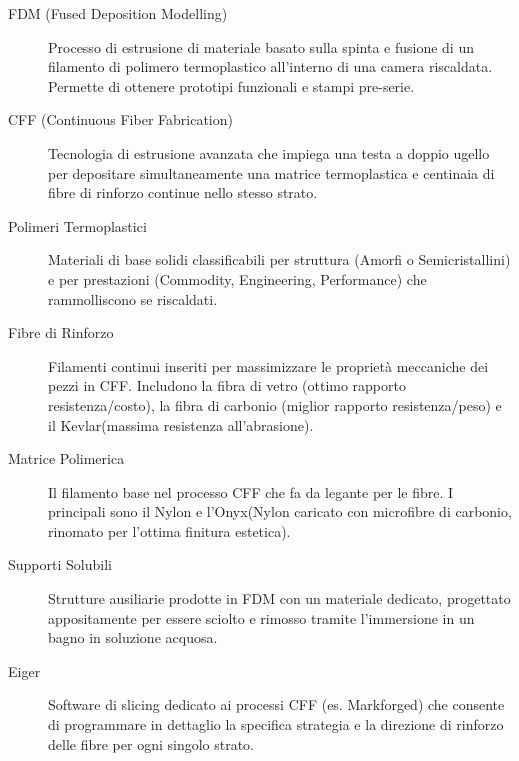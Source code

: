 \vspace{0.5cm}
\noindent{\large\sffamily\bfseries\textcolor{black!60}{Fabbricazione Additiva (Polimeri Solidi)}}\par
\begin{description}
    \item [FDM (Fused Deposition Modelling)] Processo di estrusione di materiale basato sulla spinta e fusione di un filamento di polimero termoplastico all'interno di una camera riscaldata. Permette di ottenere prototipi funzionali e stampi pre-serie.
    \item [CFF (Continuous Fiber Fabrication)] Tecnologia di estrusione avanzata che impiega una testa a doppio ugello per depositare simultaneamente una matrice termoplastica e centinaia di fibre di rinforzo continue nello stesso strato.
    \item [Polimeri Termoplastici] Materiali di base solidi classificabili per struttura (Amorfi o Semicristallini) e per prestazioni (Commodity, Engineering, Performance) che rammolliscono se riscaldati.
    \item [Fibre di Rinforzo] Filamenti continui inseriti per massimizzare le proprietà meccaniche dei pezzi in CFF. Includono la fibra di vetro (ottimo rapporto resistenza/costo), la fibra di carbonio (miglior rapporto resistenza/peso) e il Kevlar\texttrademark (massima resistenza all'abrasione).
    \item [Matrice Polimerica] Il filamento base nel processo CFF che fa da legante per le fibre. I principali sono il Nylon e l'Onyx\texttrademark (Nylon caricato con microfibre di carbonio, rinomato per l'ottima finitura estetica).
    \item [Supporti Solubili] Strutture ausiliarie prodotte in FDM con un materiale dedicato, progettato appositamente per essere sciolto e rimosso tramite l'immersione in un bagno in soluzione acquosa.
    \item [Eiger] Software di slicing dedicato ai processi CFF (es. Markforged) che consente di programmare in dettaglio la specifica strategia e la direzione di rinforzo delle fibre per ogni singolo strato.
\end{description}

